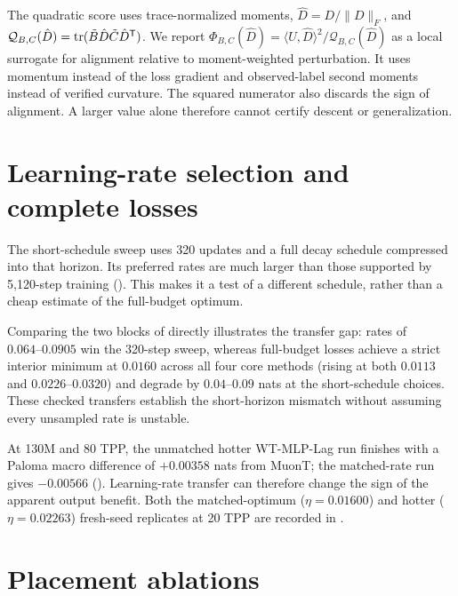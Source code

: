 The quadratic score uses trace-normalized moments, $\hat D=D/\|D\|_F$, and $\mathcal Q_{B,C}(\hat D)=\operatorname{tr}(\tilde B\hat D\tilde C\hat D^{{\mathsf{T}}})$. We report $\Phi_{B,C}(\hat D)=\langle U,\hat D\rangle^2/\mathcal Q_{B,C}(\hat D)$ as a local surrogate for alignment relative to moment-weighted perturbation. It uses momentum instead of the loss gradient and observed-label second moments instead of verified curvature. The squared numerator also discards the sign of alignment. A larger value alone therefore cannot certify descent or generalization.

\FloatBarrier
\section{Learning-rate selection and complete losses}
\label{app:appendix_lr}

The short-schedule sweep uses 320 updates and a full decay schedule compressed into that horizon. Its preferred rates are much larger than those supported by 5,120-step training (). This makes it a test of a different schedule, rather than a cheap estimate of the full-budget optimum.



Comparing the two blocks of  directly illustrates the transfer gap: rates of $0.064\text{--}0.0905$ win the 320-step sweep, whereas full-budget losses achieve a strict interior minimum at $0.0160$ across all four core methods (rising at both $0.0113$ and $0.0226\text{--}0.0320$) and degrade by $0.04\text{--}0.09$ nats at the short-schedule choices. These checked transfers establish the short-horizon mismatch without assuming every unsampled rate is unstable.

At 130M and 80 TPP, the unmatched hotter WT-MLP-Lag run finishes with a Paloma macro difference of $+0.00358$ nats from MuonT; the matched-rate run gives $-0.00566$ (). Learning-rate transfer can therefore change the sign of the apparent output benefit. Both the matched-optimum ($\eta=0.01600$) and hotter ($\eta=0.02263$) fresh-seed replicates at 20 TPP are recorded in .




\FloatBarrier
\section{Placement ablations}
\label{app:ablations}


